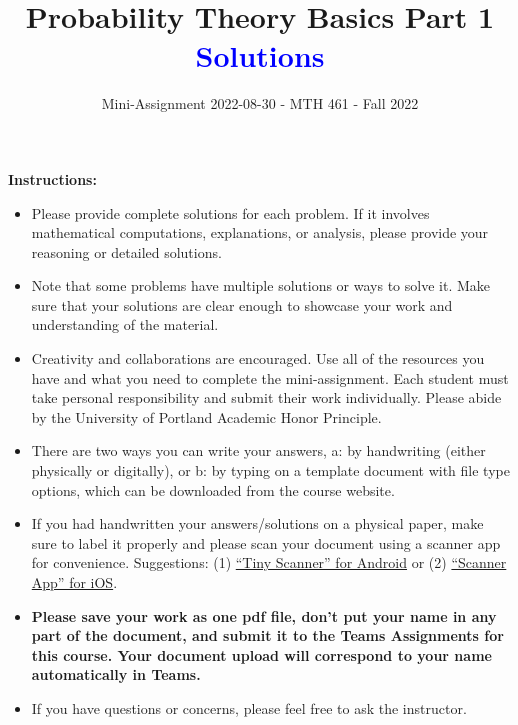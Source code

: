 \documentclass[
]{article}
\title{\textbf{Probability Theory Basics Part 1 \textcolor{blue}{Solutions}}}
\subtitle{Mini-Assignment 2022-08-30 - MTH 461 - Fall 2022}
\author{}
\date{\vspace{-2.5em}}
\begin{document}
\maketitle

\hfill\break

\textbf{Instructions:}

\begin{itemize}
\item
  Please provide complete solutions for each problem. If it involves mathematical computations, explanations, or analysis, please provide your reasoning or detailed solutions.
\item
  Note that some problems have multiple solutions or ways to solve it. Make sure that your solutions are clear enough to showcase your work and understanding of the material.
\item
  Creativity and collaborations are encouraged. Use all of the resources you have and what you need to complete the mini-assignment. Each student must take personal responsibility and submit their work individually. Please abide by the University of Portland Academic Honor Principle.
\item
  There are two ways you can write your answers, a: by handwriting (either physically or digitally), or b: by typing on a template document with file type options, which can be downloaded from the course website.
\item
  If you had handwritten your answers/solutions on a physical paper, make sure to label it properly and please scan your document using a scanner app for convenience. Suggestions: (1) \href{https://play.google.com/store/apps/details?id=com.appxy.tinyscanner\&hl=en_US\&gl=US}{``Tiny Scanner'' for Android} or (2) \href{https://apps.apple.com/us/app/scanner-app-scan-pdf-document/id595563753}{``Scanner App'' for iOS}.
\item
  \textbf{Please save your work as one pdf file, don't put your name in any part of the document, and submit it to the Teams Assignments for this course. Your document upload will correspond to your name automatically in Teams.}
\item
  If you have questions or concerns, please feel free to ask the instructor.
\end{itemize}

\newpage
\end{document}
